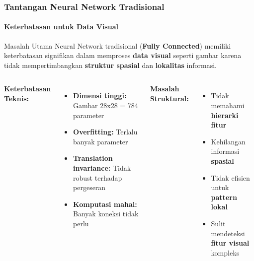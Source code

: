 \documentclass[t,aspectratio=169,xcolor=dvipsnames]{beamer}
\begin{document}
\begin{frame}
    \frametitle{Tantangan Neural Network Tradisional}
    \framesubtitle{Keterbatasan untuk Data Visual}
    \small

    \begin{alertblock}{Masalah Utama}
        Neural Network tradisional (\textbf{Fully Connected}) memiliki keterbatasan signifikan dalam memproses \textbf{data visual} seperti gambar karena tidak mempertimbangkan \textbf{struktur spasial} dan \textbf{lokalitas} informasi.
    \end{alertblock}

    \begin{columns}[t]
        \textbf{Keterbatasan Teknis:}
        \begin{itemize}
            \item \textbf{Dimensi tinggi:} Gambar 28x28 = 784 parameter
            \item \textbf{Overfitting:} Terlalu banyak parameter
            \item \textbf{Translation invariance:} Tidak robust terhadap pergeseran
            \item \textbf{Komputasi mahal:} Banyak koneksi tidak perlu
        \end{itemize}

        \textbf{Masalah Struktural:}
        \begin{itemize}
            \item Tidak memahami \textbf{hierarki fitur}
            \item Kehilangan informasi \textbf{spasial}
            \item Tidak efisien untuk \textbf{pattern lokal}
            \item Sulit mendeteksi \textbf{fitur visual} kompleks
        \end{itemize}
    \end{columns}

\end{frame}
\end{document}
